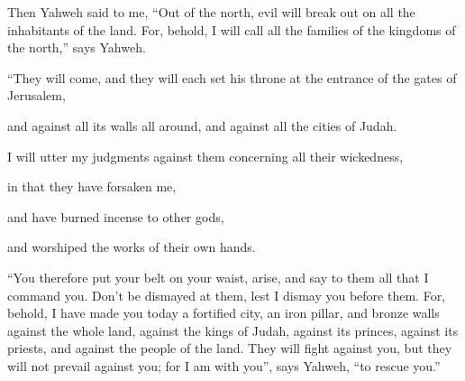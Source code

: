 {\par }{\PP {}Then Yahweh said to me, “Out of the north, evil will break out on all the inhabitants of the land.
For, behold, I will call all the families of the kingdoms of the north,” says Yahweh.
\par }{\Q “They will come, and they will each set his throne at the entrance of the gates of Jerusalem,
\par }{\QB and against all its walls all around, and against all the cities of Judah.
\par }{\Q {}I will utter my judgments against them concerning all their wickedness,
\par }{\QB in that they have forsaken me,
\par }{\QB and have burned incense to other gods,
\par }{\QB and worshiped the works of their own hands.
\par }{\PP {}“You therefore put your belt on your waist, arise, and say to them all that I command you. Don’t be dismayed at them, lest I dismay you before them.
For, behold, I have made you today a fortified city, an iron pillar, and bronze walls against the whole land, against the kings of Judah, against its princes, against its priests, and against the people of the land.
They will fight against you, but they will not prevail against you; for I am with you”, says Yahweh, “to rescue you.”

}

